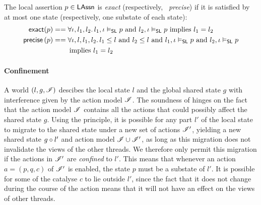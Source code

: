 
\begin{definition}
The local assertion   $p\in\mathsf{LAssn}$ is \emph{exact}
(respectively, 
\ \emph{precise}) if it is
  satisfied by at most one state (respectively, one substate of each state):
  \begin{align*}
    \textsf{exact}(p) &==
    \forall \iota, l_1, l_2.\, l_1, \iota \mathrel{\vDash_{\mathsf{SL}}} p\text{ and }l_2, \iota
    \mathrel{\vDash_{\mathsf{SL}}} p\text{ implies } l_1 = l_2\\
    \textsf{precise} \left( p \right) &==
    \forall \iota, l, l_1, l_2.\, l_1\leq l\text{ and }l_2\leq l\text{ and }l_1, \iota \mathrel{\vDash_{\mathsf{SL}}} p\text{ and }l_2, \iota
    \mathrel{\vDash_{\mathsf{SL}}} p\\
    &\qquad\text{ implies } l_1 = l_2
  \end{align*}
\end{definition}

\paragraph{Confinement}

A \colosl world $(l,g,\mathscr{I})$ descibes the local state $l$ and the
global shared state $g$ with interference given by the action model
$\mathscr{I}$.  The soundness of \colosl hinges on the fact that the action
model $\mathscr{I}$ contains all the actions that could possibly affect the
shared state $g$. Using the \extendRule principle, it is possible for
any part $l'$ of the local state to migrate to the shared state under
a new set of actions $\mathscr{I}'$, yielding a new shared state $g\circ
l'$ and action model $\mathscr{I} \cup \mathscr{I}'$, as long as this migration
does not invalidate the views of the other threads. We therefore only
permit this migration if the actions in $\mathscr{I}'$ are \emph{confined}
to $l'$. This means that whenever an action $a = (p, q, c)$ of
$\mathscr{I}'$ is enabled, the state $p$ must be a substate of $l'$.  It is
possible for some of the catalyse $c$ to lie outside $l'$, since the
fact that it does not change during the course of the action means
that it will not have an effect on the views of other threads.







